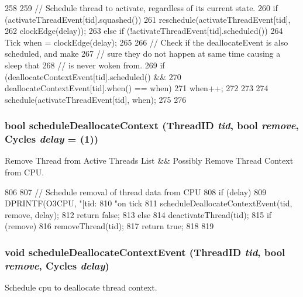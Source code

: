 \begin{DoxyCode}
258     {
259         // Schedule thread to activate, regardless of its current state.
260         if (activateThreadEvent[tid].squashed())
261             reschedule(activateThreadEvent[tid],
262                        clockEdge(delay));
263         else if (!activateThreadEvent[tid].scheduled()) {
264             Tick when = clockEdge(delay);
265 
266             // Check if the deallocateEvent is also scheduled, and make
267             // sure they do not happen at same time causing a sleep that
268             // is never woken from.
269             if (deallocateContextEvent[tid].scheduled() &&
270                 deallocateContextEvent[tid].when() == when) {
271                 when++;
272             }
273 
274             schedule(activateThreadEvent[tid], when);
275         }
276     }
\end{DoxyCode}
\hypertarget{classFullO3CPU_a64179a936408228ff1718afd541e230b}{
\subsubsection[{scheduleDeallocateContext}]{\setlength{\rightskip}{0pt plus 5cm}bool scheduleDeallocateContext ({\bf ThreadID} {\em tid}, \/  bool {\em remove}, \/  {\bf Cycles} {\em delay} = {(1)})}}
\label{classFullO3CPU_a64179a936408228ff1718afd541e230b}
Remove Thread from Active Threads List \&\& Possibly Remove Thread Context from CPU. 


\begin{DoxyCode}
806 {
807     // Schedule removal of thread data from CPU
808     if (delay){
809         DPRINTF(O3CPU, "[tid:%
810                 "on tick %
811         scheduleDeallocateContextEvent(tid, remove, delay);
812         return false;
813     } else {
814         deactivateThread(tid);
815         if (remove)
816             removeThread(tid);
817         return true;
818     }
819 }
\end{DoxyCode}
\hypertarget{classFullO3CPU_a8c575b3dcfc822888003b64457ac9755}{
\subsubsection[{scheduleDeallocateContextEvent}]{\setlength{\rightskip}{0pt plus 5cm}void scheduleDeallocateContextEvent ({\bf ThreadID} {\em tid}, \/  bool {\em remove}, \/  {\bf Cycles} {\em delay})}}
\label{classFullO3CPU_a8c575b3dcfc822888003b64457ac9755}
Schedule cpu to deallocate thread context. 


